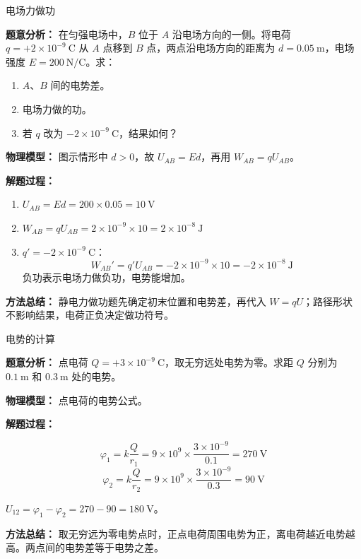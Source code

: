 \begin{examplebox}{电场力做功}

\textbf{题意分析：} 在匀强电场中，$B$ 位于 $A$ 沿电场方向的一侧。将电荷 $q = +2 \times 10^{-9}\ \mathrm{C}$ 从 $A$ 点移到 $B$ 点，两点沿电场方向的距离为 $d = 0.05\ \mathrm{m}$，电场强度 $E = 200\ \mathrm{N/C}$。求：
\begin{enumerate}
  \item $A$、$B$ 间的电势差。
  \item 电场力做的功。
  \item 若 $q$ 改为 $-2 \times 10^{-9}\ \mathrm{C}$，结果如何？
\end{enumerate}

\textbf{物理模型：} 图示情形中 $d>0$，故 $U_{AB}=Ed$，再用 $W_{AB}=qU_{AB}$。

\textbf{解题过程：}

\begin{enumerate}
  \item $U_{AB} = Ed = 200 \times 0.05 = 10\ \mathrm{V}$

  \item $W_{AB} = qU_{AB} = 2 \times 10^{-9} \times 10 = 2 \times 10^{-8}\ \mathrm{J}$

  \item $q' = -2 \times 10^{-9}\ \mathrm{C}$：
  \[
  W_{AB}' = q'U_{AB} = -2 \times 10^{-9} \times 10 = -2 \times 10^{-8}\ \mathrm{J}
  \]
  负功表示电场力做负功，电势能增加。
\end{enumerate}

\textbf{方法总结：} 静电力做功题先确定初末位置和电势差，再代入 $W=qU$；路径形状不影响结果，电荷正负决定做功符号。

\end{examplebox}

\begin{examplebox}{电势的计算}

\textbf{题意分析：} 点电荷 $Q = +3 \times 10^{-9}\ \mathrm{C}$，取无穷远处电势为零。求距 $Q$ 分别为 $0.1\ \mathrm{m}$ 和 $0.3\ \mathrm{m}$ 处的电势。

\textbf{物理模型：} 点电荷的电势公式。

\textbf{解题过程：}

\[
\varphi_1 = k\frac{Q}{r_1} = 9 \times 10^9 \times \frac{3 \times 10^{-9}}{0.1} = 270\ \mathrm{V}
\]
\[
\varphi_2 = k\frac{Q}{r_2} = 9 \times 10^9 \times \frac{3 \times 10^{-9}}{0.3} = 90\ \mathrm{V}
\]

$U_{12} = \varphi_1 - \varphi_2 = 270 - 90 = 180\ \mathrm{V}$。

\textbf{方法总结：} 取无穷远为零电势点时，正点电荷周围电势为正，离电荷越近电势越高。两点间的电势差等于电势之差。

\end{examplebox}

